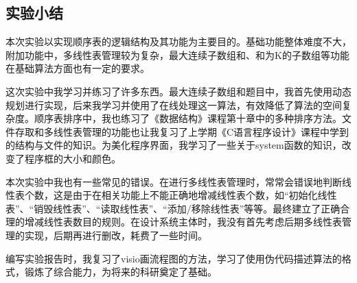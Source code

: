 \documentclass[supercite]{Experimental_Report}
\theoremstyle{definition}
\begin{document}
\subsection{实验小结}

本次实验以实现顺序表的逻辑结构及其功能为主要目的。基础功能整体难度不大，附加功能中，多线性表管理较为复杂，最大连续子数组和、和为K的子数组等功能在基础算法方面也有一定的要求。

这次实验中我学习并练习了许多东西。最大连续子数组和题目中，我首先使用动态规划进行实现，后来我学习并使用了在线处理这一算法，有效降低了算法的空间复杂度。顺序表排序中，我也练习了《数据结构》课程第十章中的多种排序方法。文件存取和多线性表管理的功能也让我复习了上学期《C语言程序设计》课程中学到的结构与文件的知识。为美化程序界面，我学习了一些关于system函数的知识，改变了程序框的大小和颜色。

本次实验中我也有一些常见的错误。在进行多线性表管理时，常常会错误地判断线性表个数，这是由于在相关功能上不能正确地增减线性表个数，如“初始化线性表”、“销毁线性表”、“读取线性表”、“添加/移除线性表”等等。最终建立了正确合理的增减线性表数目的规则。在设计系统主体时，我没有首先考虑后期多线性表管理的实现，后期再进行删改，耗费了一些时间。

编写实验报告时，我复习了visio画流程图的方法，学习了使用伪代码描述算法的格式，锻炼了综合能力，为将来的科研奠定了基础。

\newpage



\end{document}
